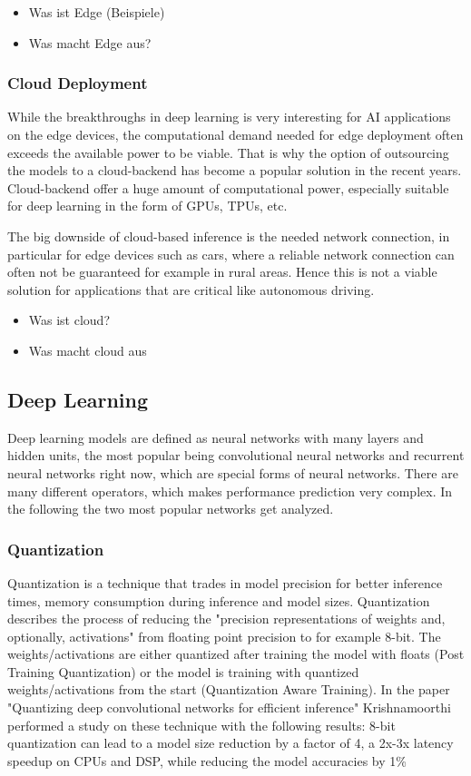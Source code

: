 \begin{itemize}
    \item Was ist Edge (Beispiele)
    \item Was macht Edge aus?
\end{itemize}
\subsubsection{Cloud Deployment}
While the breakthroughs in deep learning is very interesting for AI applications on the edge devices, the computational demand needed for edge deployment often exceeds the available power to be viable.
That is why the option of outsourcing the models to a cloud-backend has become a popular solution in the recent years.
Cloud-backend offer a huge amount of computational power, especially suitable for deep learning in the form of GPUs, TPUs, etc.


The big downside of cloud-based inference is the needed network connection, in particular for edge devices such as cars, where a reliable network connection can often not be guaranteed for example in rural areas. Hence this is not a viable solution for applications that are critical like autonomous driving.
\begin{itemize}
    \item Was ist cloud?
    \item Was macht cloud aus
\end{itemize}

\subsection{Deep Learning}
Deep learning models are defined as neural networks with many layers and hidden units, the most popular being convolutional neural networks and recurrent neural networks right now, which are special forms of neural networks.
There are many different operators, which makes performance prediction very complex.
In the following the two most popular networks get analyzed.
\subsubsection{Quantization}
Quantization is a technique that trades in model precision for better inference times, memory consumption during inference and model sizes.
Quantization describes the process of reducing the "precision representations of weights and, optionally, activations" \cite{tfLiteQuant} from floating point precision to for example 8-bit.
The weights/activations are either quantized after training the model with floats (Post Training Quantization) or the model is training with quantized weights/activations from the start (Quantization Aware Training). In the paper "Quantizing deep convolutional networks for
efficient inference"\cite{Quantizing} Krishnamoorthi performed a study on these technique with the following results:
8-bit quantization can lead to a model size reduction by a factor of 4, a 2x-3x latency speedup on CPUs and DSP, while reducing the model accuracies by 1\%


